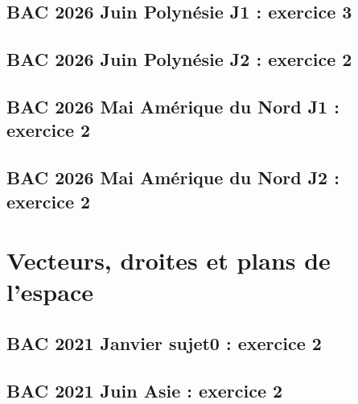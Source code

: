 \documentclass[lang=fr,edition=teacher,layout=sheet]{mxbook}
\begin{document}
\begingroup\endgroup
\par\bigskip
{}\subsection*{BAC 2026 Juin Polynésie J1 : exercice 3}
\begingroup\endgroup
\par\bigskip
{}\subsection*{BAC 2026 Juin Polynésie J2 : exercice 2}
\begingroup\endgroup
\par\bigskip
{}\subsection*{BAC 2026 Mai Amérique du Nord J1 : exercice 2}
\begingroup\endgroup
\par\bigskip
{}\subsection*{BAC 2026 Mai Amérique du Nord J2 : exercice 2}
\begingroup\endgroup
\par\bigskip
\clearpage\section*{Vecteurs, droites et plans de l'espace}
\subsection*{BAC 2021 Janvier sujet0 : exercice 2}
\begingroup\endgroup
\par\bigskip
{}\subsection*{BAC 2021 Juin Asie : exercice 2}
\end{document}
